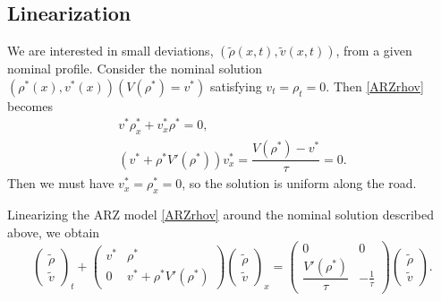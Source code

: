 \documentclass[preprint]{elsarticle}
\begin{document}
\subsection{Linearization}
We are interested in small deviations, $(\tilde{\rho}(x,t), \tilde{v}(x,t))$, from a given nominal profile. Consider the nominal solution $(\rho^*(x),v^*(x))(V(\rho^*) = v^*)$ satisfying $v_t = \rho_t = 0$. Then \eqref{ARZrhov} becomes
\begin{align}
v^* \rho^*_x + v^*_x\rho^* = 0, \\
( v^* + \rho^* V'( \rho^*) )v^*_x = \dfrac{V(\rho^*) - v^*}{\tau} = 0.
\end{align}
Then we must have $v^*_x=\rho^*_x=0$, so the solution is uniform along the road. 

Linearizing the ARZ model \eqref{ARZrhov} around the nominal solution described above, we obtain
\begin{equation} \label{rhovlin}
\begin{pmatrix}
\tilde{\rho} \\ \tilde{v}
\end{pmatrix}_t
+ \begin{pmatrix}
v^* & \rho^* \\
0 & v^* + \rho^* V' ( \rho^*) 
\end{pmatrix}
\begin{pmatrix}
\tilde{\rho} \\ \tilde{v}
\end{pmatrix}_x = 
\begin{pmatrix}
0 & 0 \\
\dfrac{V' (\rho^*)}{\tau} & -\frac{1}{\tau}
\end{pmatrix}
\begin{pmatrix}
\tilde{\rho} \\ \tilde{v}
\end{pmatrix}.
\end{equation}
\end{document}
